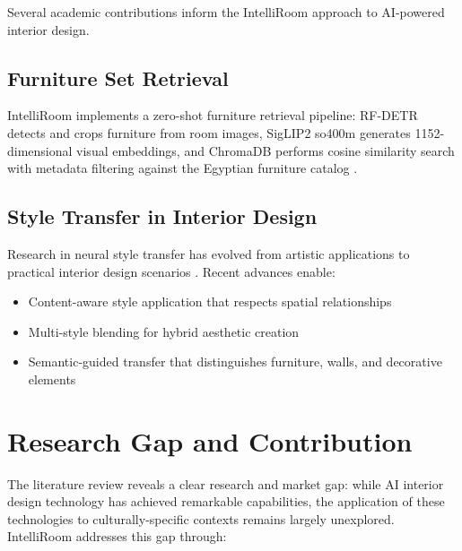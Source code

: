 Several academic contributions inform the IntelliRoom approach to AI-powered interior design.

\subsection{Furniture Set Retrieval}

IntelliRoom implements a zero-shot furniture retrieval pipeline: RF-DETR detects and crops furniture from room images, SigLIP2 so400m generates 1152-dimensional visual embeddings, and ChromaDB performs cosine similarity search with metadata filtering against the Egyptian furniture catalog \cite{rfdetr2025, siglip22025}.

\subsection{Style Transfer in Interior Design}

Research in neural style transfer has evolved from artistic applications to practical interior design scenarios \cite{gatys2016image}. Recent advances enable:

\begin{itemize}
    \item Content-aware style application that respects spatial relationships
    \item Multi-style blending for hybrid aesthetic creation
    \item Semantic-guided transfer that distinguishes furniture, walls, and decorative elements
\end{itemize}



\section{Research Gap and Contribution}
\label{sec:research_gap}

The literature review reveals a clear research and market gap: while AI interior design technology has achieved remarkable capabilities, the application of these technologies to culturally-specific contexts remains largely unexplored. IntelliRoom addresses this gap through:

